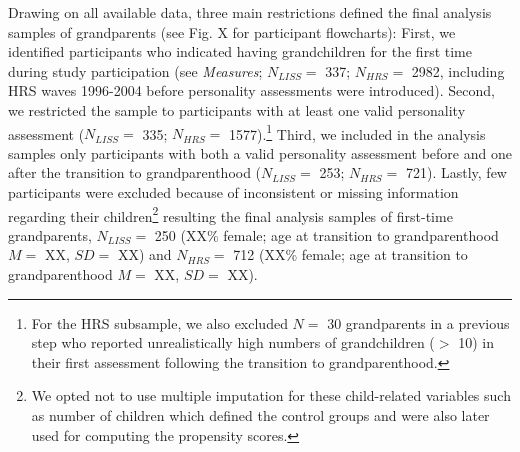 \documentclass[
  english,
  man, noextraspace]{apa7}
\begin{document}
Drawing on all available data, three main restrictions defined the final analysis samples of grandparents (see Fig. X for participant flowcharts): First, we identified participants who indicated having grandchildren for the first time during study participation (see \emph{Measures}; \(N_{LISS} =\) 337; \(N_{HRS} =\) 2982, including HRS waves 1996-2004 before personality assessments were introduced). Second, we restricted the sample to participants with at least one valid personality assessment (\(N_{LISS} =\) 335; \(N_{HRS} =\) 1577).\footnote{For the HRS subsample, we also excluded \(N =\) 30 grandparents in a previous step who reported unrealistically high numbers of grandchildren (\(>\) 10) in their first assessment following the transition to grandparenthood.} Third, we included in the analysis samples only participants with both a valid personality assessment before and one after the transition to grandparenthood (\(N_{LISS} =\) 253; \(N_{HRS} =\) 721). Lastly, few participants were excluded because of inconsistent or missing information regarding their children\footnote{We opted not to use multiple imputation for these child-related variables such as number of children which defined the control groups and were also later used for computing the propensity scores.} resulting the final analysis samples of first-time grandparents, \(N_{LISS} =\) 250 (XX\% female; age at transition to grandparenthood \(M =\) XX, \(SD =\) XX) and \(N_{HRS} =\) 712 (XX\% female; age at transition to grandparenthood \(M =\) XX, \(SD =\) XX).\\
\end{document}
